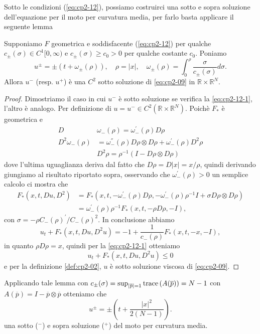 \begin{osservazione}
Sotto le condizioni (\hyperref[eq:cp2-12-1]{\ref{eq:cp2-12}\ped{$\pm$}}), possiamo costruirci una sotto e sopra soluzione dell'equazione per il moto per curvatura media, per farlo basta applicare il seguente lemma
\begin{lemma}
Supponiamo $F$ geometrica e soddisfacente (\hyperref[eq:cp2-12-1]{\ref{eq:cp2-12}\ped{$\pm$}}) per qualche $c_{\pm}(\sigma)\in C^1[0,\infty)$ e $c_{\pm}(\sigma)\geq c_0>0$ per qualche costante $c_0$. Poniamo \[
u^{\pm}=\pm(t+\omega_{\pm}(\rho)),\quad \rho=|x|,\quad\omega_{\pm}(\rho)=\int_0^{\rho}\frac{\sigma}{c_{\pm}(\sigma)}d\sigma.
\]
Allora $u^-$ (resp. $u^+$) è una $C^2$ sotto soluzione di \eqref{eq:cp2-09} in $\mathbb{R}\times\mathbb{R}^N$.
\end{lemma}
\begin{proof}
Dimostriamo il caso in cui $u^-$ è sotto soluzione se verifica la \eqref{eq:cp2-12-1}, l'altro è analogo. Per definizione di $u=u^-\in C^2(\mathbb{R}\times\mathbb{R}^N)$. Poichè $F_*$ è geometrica e
\[
\begin{aligned}
D&\omega_{-}(\rho)=\omega_{-}^{'}(\rho)D\rho \\
D^2\omega_{-}(\rho)&=\omega_{-}^{''}(\rho)D\rho\otimes D\rho+\omega_{-}^{'}(\rho)D^2\rho \\
&D^2\rho = \rho^{-1}(I-D\rho\otimes D\rho)
\end{aligned}
\]
dove l'ultima uguaglianza deriva dal fatto che $D\rho = D|x| = x/\rho$, quindi derivando giungiamo al risultato riportato sopra, osservando che $\omega_{-}^{'}(\rho)> 0$ un semplice calcolo ci mostra che
\[
\begin{aligned}
F_*(x,t,Du,D^2) &= F_{*}(x,t,-\omega_{-}^{'}(\rho)D\rho,-\omega_{-}^{'}(\rho)\rho^{-1}I+\sigma D\rho\otimes D\rho) \\
&=\omega_{-}^{'}(\rho)\rho^{-1}F_*(x,t,-\rho D\rho,-I),
\end{aligned}
\] 
con $\sigma = -\rho C_{-}(\rho)^{'}/C_{-}(\rho)^2$.
In conclusione abbiamo
\[
u_t + F_*(x,t,Du,D^2u) = -1 + \frac{1}{c_{-}(\rho)}F_*(x,t,-x,-I),
\]
in quanto  $\rho D\rho=x$, quindi per la \eqref{eq:cp2-12-1} otteniamo
\[
u_t + F_*(x,t,Du,D^2u)\leq 0
\]
e per la definizione \ref{def:cp2-02}, $u$ è sotto soluzione viscosa di \eqref{eq:cp2-09}.
\end{proof}
Applicando tale lemma con $c_{\pm}(\sigma)=\sup_{|\overline{p}|=1}\operatorname{trace}\left(A(\overline{p})\right)=N-1$ con $A(\overline{p})=I-\overline{p}\otimes\overline{p}$ otteniamo che
\[
u^{\pm}=\pm\left(t+\frac{|x|^2}{2(N-1)}\right).
\]
una sotto ($^-$) e sopra soluzione ($^+$) del moto per curvatura media.
\end{osservazione}
